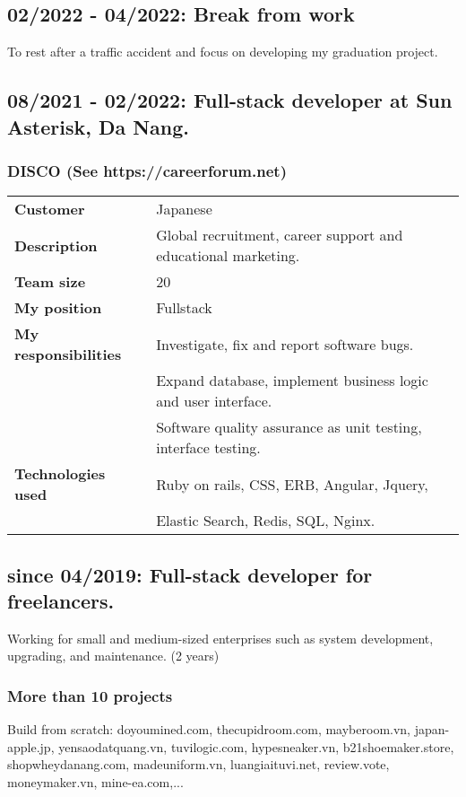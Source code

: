 \documentclass[10pt]{article} %
\begin{document}
\subsection*{  02/2022 - 04/2022: Break from work}
To rest after a traffic accident and focus on developing my graduation project.

\pagebreak

\subsection*{08/2021 - 02/2022: Full-stack developer at Sun Asterisk, Da Nang.}

\subsubsection*{DISCO (See https://careerforum.net)}
\begin{tabular}{ll}
  \textbf{Customer} & Japanese \\
  \textbf{Description} & Global recruitment, career support and educational marketing. \\
  \textbf{Team size} & 20 \\
  \textbf{My position} & Fullstack \\
  \textbf{My responsibilities} & Investigate, fix and report software bugs. \\
                               &  Expand database, implement business logic and user interface. \\
                               &  Software quality assurance as unit testing, interface testing. \\
  \textbf{Technologies used} & Ruby on rails, CSS, ERB, Angular, Jquery, \\
                             & Elastic Search, Redis, SQL, Nginx. \\
\end{tabular}



\subsection*{since 04/2019: Full-stack developer for freelancers.}
Working for small and medium-sized enterprises such as system development, upgrading, and maintenance. (2 years)


\subsubsection*{More than 10 projects}
\begin{sloppypar}
Build from scratch: doyoumined.com, thecupidroom.com, mayberoom.vn, japan-apple.jp, yensaodatquang.vn,
tuvilogic.com, hypesneaker.vn, b21shoemaker.store, shopwheydanang.com, madeuniform.vn,
luangiaituvi.net, review.vote, moneymaker.vn, mine-ea.com,...
\end{sloppypar}
\end{document}
